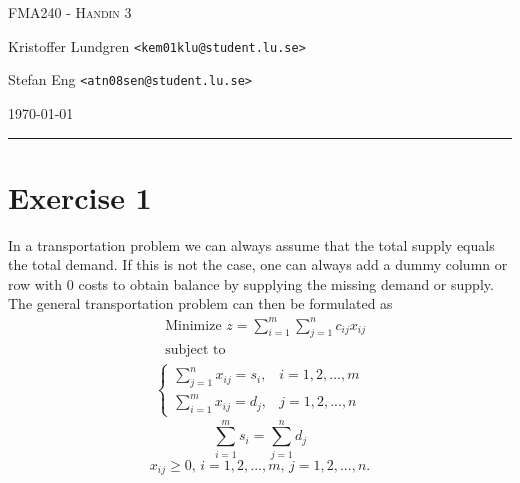 \documentclass{article}
\begin{document}


\begin{centering}
	{\scshape\Large FMA240 - Handin 3\par}
	\vspace{0.5cm}
	Kristoffer Lundgren \texttt{<kem01klu@student.lu.se>}\par
	Stefan Eng \texttt{<atn08sen@student.lu.se>}\par
    \vspace{0.5cm}
	\today\par
    \rule{\textwidth}{0.4pt}
\end{centering}

\section*{Exercise 1}
  In a transportation problem we can always assume that the total supply equals the total demand. If this is not the case, one can always add a dummy column or row with 0 costs to obtain balance by supplying the missing demand or supply. The general transportation problem can then be formulated as
  \begin{align*}
  & \text{Minimize } z = \sum_{i=1}^{m}\sum_{j=1}^n c_{ij}x_{ij} \\
  & \text{subject to}
    \label{eq1}
  \end{align*}
  \begin{align*}
    \begin{cases}
      \sum_{j=1}^{n} x_{ij} = s_{i}, & i = 1, 2, ..., m \\
      \sum_{i=1}^{m} x_{ij} = d_{j}, & j = 1, 2, ..., n
    \end{cases}
  \end{align*}
  \begin{equation*}
    \sum_{i=1}^{m} s_{i} = \sum_{j=1}^n d_{j}
    \label{eq3}
  \end{equation*}
  \begin{equation}
    x_{ij} \geq 0,\, i = 1, 2, ..., m,\, j = 1, 2, ..., n.
    \label{eq4}
  \end{equation}
\end{document}
